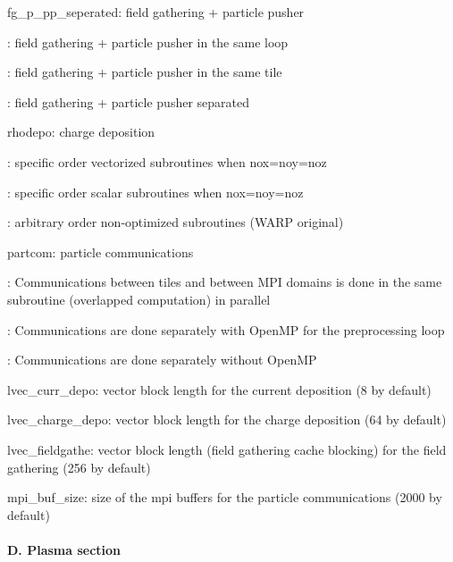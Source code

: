 \begin{DoxyItemize}
\item {\ttfamily fg\+\_\+p\+\_\+pp\+\_\+seperated}\+: field gathering + particle pusher
\begin{DoxyItemize}
\item {}\+: field gathering + particle pusher in the same loop
\item {}\+: field gathering + particle pusher in the same tile
\item {}\+: field gathering + particle pusher separated
\end{DoxyItemize}
\item {\ttfamily rhodepo}\+: charge deposition
\begin{DoxyItemize}
\item {}\+: specific order vectorized subroutines when {\ttfamily nox=noy=noz}
\item {}\+: specific order scalar subroutines when {\ttfamily nox=noy=noz}
\item {}\+: arbitrary order non-\/optimized subroutines (W\+A\+RP original)
\end{DoxyItemize}
\item {\ttfamily partcom}\+: particle communications
\begin{DoxyItemize}
\item {}\+: Communications between tiles and between M\+PI domains is done in the same subroutine (overlapped computation) in parallel
\item {}\+: Communications are done separately with Open\+MP for the preprocessing loop
\item {}\+: Communications are done separately without Open\+MP
\end{DoxyItemize}
\item {\ttfamily lvec\+\_\+curr\+\_\+depo}\+: vector block length for the current deposition (8 by default)
\item {\ttfamily lvec\+\_\+charge\+\_\+depo}\+: vector block length for the charge deposition (64 by default)
\item {\ttfamily lvec\+\_\+fieldgathe}\+: vector block length (field gathering cache blocking) for the field gathering (256 by default)
\item {\ttfamily mpi\+\_\+buf\+\_\+size}\+: size of the mpi buffers for the particle communications (2000 by default)
\end{DoxyItemize}

\paragraph*{D. Plasma section}

